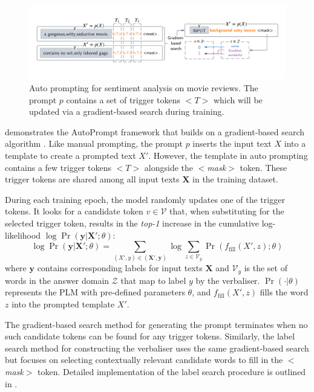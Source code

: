 \vspace{-0.5em}
\begin{figure}[!ht]
    \centering
    \includegraphics[width=\hsize]{figures/preparation_media/prepare-auto.pdf}
    \caption{Auto prompting for sentiment analysis on movie reviews. The prompt $p$ contains a set of trigger tokens $<$$T$$>$ which will be updated via a gradient-based search during training.}
    \label{fig:prepare-auto}
\end{figure}
\vspace{-0.5em}

 demonstrates the AutoPrompt framework that builds on a gradient-based search algorithm \cite{wallace19Gradientsearch}. Like manual prompting, the prompt $p$ inserts the input text $X$ into a template to create a prompted text $X'$. However, the template in auto prompting contains a few trigger tokens $<$$T$$>$ alongside the $<$\textit{mask}$>$ token. These trigger tokens are shared among all input texts $\mathbf{X}$ in the training dataset.

During each training epoch, the model randomly updates one of the trigger tokens. It looks for a candidate token $v \in \mathcal{V}$ that, when substituting for the selected trigger token, results in the \emph{top-1} increase in the cumulative log-likelihood $\log \Pr(\mathbf{y} | \mathbf{X}'; \theta)$:
\begin{equation} \label{eqn:cum_loglik}
    \log \Pr(\mathbf{y} | \mathbf{X}'; \theta) = \sum_{(X', y) \in (\mathbf{X}', \mathbf{y})} \log \sum_{z \in \mathcal{V}_y} \Pr(f_{\text{fill}}(X', z); \theta)
\end{equation}
where $\mathbf{y}$ contains corresponding labels for input texts $\mathbf{X}$ and $\mathcal{V}_y$ is the set of words in the answer domain $\mathcal{Z}$ that map to label $y$ by the verbaliser. $\Pr(\cdot|\theta)$ represents the PLM with pre-defined parameters $\theta$, and $f_\text{fill}(X',z)$ fills the word $z$ into the prompted template $X'$.

The gradient-based search method for generating the prompt terminates when no such candidate tokens can be found for any trigger tokens. Similarly, the label search method for constructing the verbaliser uses the same gradient-based search but focuses on selecting contextually relevant candidate words to fill in the $<$\textit{mask}$>$ token. Detailed implementation of the label search procedure is outlined in .

